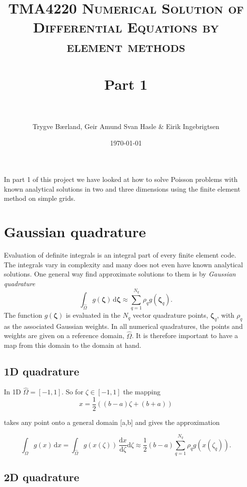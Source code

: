 \documentclass[paper=a4, fontsize=11pt]{scrartcl} %
\title{	
\normalfont \normalsize 
\textsc{TMA4220 Numerical Solution of Differential Equations by element methods} \\ [25pt] %
\horrule{0.5pt} \\[0.4cm] %
\huge Part 1 \\ %
\horrule{2pt} \\[0.5cm] %
}
\author{Trygve Bærland, Geir Amund Svan Hasle \& Eirik Ingebrigtsen} %
\date{\normalsize\today} %
\begin{document}
\maketitle

In part 1 of this project we have looked at how to solve Poisson problems with known analytical solutions in two and three dimensions using the finite element method on simple grids.

\section{Gaussian quadrature}
Evaluation of definite integrals is an integral part of every finite element code. The integrals vary in complexity and many does not even have known analytical solutions. One general way find approximate solutions to them is by  \textit{Gaussian quadrature}
\[ \int_{\hat{\Omega}} \! g(\mathbf{\zeta}) \, \mathrm{d}\mathbf{\zeta} \approx \sum_{q=1}^{N_q} \rho_{q}g(\mathbf{\zeta}_q).
\]
The function $g(\mathbf{\zeta})$ is evaluated in the $N_q$ vector quadrature points, $\mathbf{\zeta}_q$, with $\rho_q$ as the associated Gaussian weights. In all numerical quadratures, the points and weights are given on a reference domain, $\hat{\Omega}$. It is therefore important to have a map from this domain to the domain at hand.

\subsection{1D quadrature}

In 1D $\hat{\Omega}=[-1,1]$. So for $\zeta \in [-1,1]$ the mapping
\[ x=\frac{1}{2} \left((b-a) \zeta +(b+a)\right)
\]

takes any point onto a general domain [a,b] and gives the approximation

\[ \int_{\Omega} \! g(x) \, \mathrm{d}x = \int_{\hat{\Omega}} \! g\left(x(\zeta)\right) \, \frac{\mathrm{d}x}{\mathrm{d}\zeta}\mathrm{d}\zeta \approx \frac{1}{2}(b-a) \sum_{q=1}^{N_q} \rho_{q}g(x(\zeta_q)).
\]

\subsection{2D quadrature}
\end{document}
